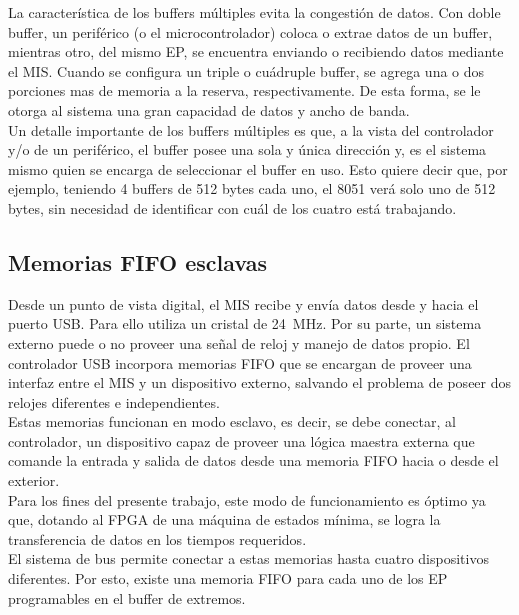 	La característica de los buffers múltiples evita la congestión de datos. Con doble buffer, un periférico (o el microcontrolador) coloca o extrae datos de un buffer, mientras otro, del mismo EP, se encuentra enviando o recibiendo datos mediante el MIS. Cuando se configura un triple o cuádruple buffer, se agrega una o dos porciones mas de memoria a la reserva, respectivamente. De esta forma, se le otorga al sistema una gran capacidad de datos y ancho de banda.\\
	
	Un detalle importante de los buffers múltiples es que, a la vista del controlador y/o de un periférico, el buffer posee una sola y única dirección y, es el sistema mismo quien se encarga de seleccionar el buffer en uso. Esto quiere decir que, por ejemplo, teniendo 4 buffers de 512 bytes cada uno, el 8051 verá solo uno de 512 bytes, sin necesidad de identificar con cuál de los cuatro está trabajando.\\   

\subsection{Memorias FIFO esclavas}		

	Desde un punto de vista digital, el MIS recibe y envía datos desde y hacia el puerto USB. Para ello utiliza un cristal de \SI{24}{\mega\hertz}. Por su parte, un sistema externo puede o no proveer una señal de reloj y manejo de datos propio. El controlador USB incorpora memorias FIFO que se encargan de proveer una interfaz entre el MIS y un dispositivo externo, salvando el problema de poseer dos relojes diferentes e independientes.\\
	
	Estas memorias funcionan en modo esclavo, es decir, se debe conectar, al controlador, un dispositivo  capaz de proveer una lógica maestra externa que comande la entrada y salida de datos desde una memoria FIFO hacia o desde el exterior.\\
	
	Para los fines del presente trabajo, este modo de funcionamiento es óptimo ya que, dotando al FPGA de una máquina de estados mínima, se logra la transferencia de datos en los tiempos requeridos.\\
	
	El sistema de bus permite conectar a estas memorias hasta cuatro dispositivos diferentes. Por esto, existe una memoria FIFO para cada uno de los EP programables en el buffer de extremos.\\
	
